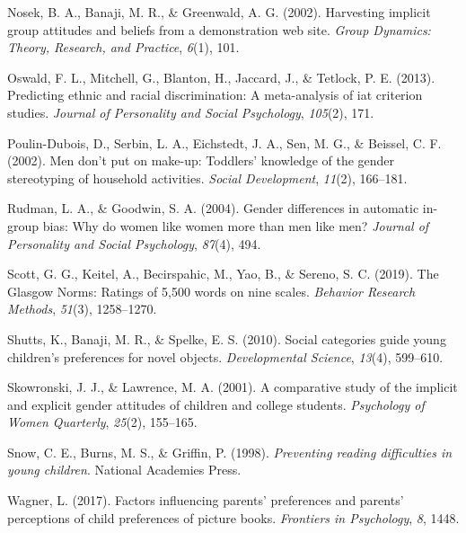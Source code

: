 \documentclass[
  english,
  ,man,floatsintext]{apa6}
\begin{document}
\leavevmode\hypertarget{ref-nosek2002harvesting}{}%
Nosek, B. A., Banaji, M. R., \& Greenwald, A. G. (2002). Harvesting implicit group attitudes and beliefs from a demonstration web site. \emph{Group Dynamics: Theory, Research, and Practice}, \emph{6}(1), 101.

\leavevmode\hypertarget{ref-oswald2013predicting}{}%
Oswald, F. L., Mitchell, G., Blanton, H., Jaccard, J., \& Tetlock, P. E. (2013). Predicting ethnic and racial discrimination: A meta-analysis of iat criterion studies. \emph{Journal of Personality and Social Psychology}, \emph{105}(2), 171.

\leavevmode\hypertarget{ref-poulin2002men}{}%
Poulin-Dubois, D., Serbin, L. A., Eichstedt, J. A., Sen, M. G., \& Beissel, C. F. (2002). Men don't put on make-up: Toddlers' knowledge of the gender stereotyping of household activities. \emph{Social Development}, \emph{11}(2), 166--181.

\leavevmode\hypertarget{ref-rudman2004gender}{}%
Rudman, L. A., \& Goodwin, S. A. (2004). Gender differences in automatic in-group bias: Why do women like women more than men like men? \emph{Journal of Personality and Social Psychology}, \emph{87}(4), 494.

\leavevmode\hypertarget{ref-scott2019glasgow}{}%
Scott, G. G., Keitel, A., Becirspahic, M., Yao, B., \& Sereno, S. C. (2019). The Glasgow Norms: Ratings of 5,500 words on nine scales. \emph{Behavior Research Methods}, \emph{51}(3), 1258--1270.

\leavevmode\hypertarget{ref-shutts2010social}{}%
Shutts, K., Banaji, M. R., \& Spelke, E. S. (2010). Social categories guide young children's preferences for novel objects. \emph{Developmental Science}, \emph{13}(4), 599--610.

\leavevmode\hypertarget{ref-skowronski2001comparative}{}%
Skowronski, J. J., \& Lawrence, M. A. (2001). A comparative study of the implicit and explicit gender attitudes of children and college students. \emph{Psychology of Women Quarterly}, \emph{25}(2), 155--165.

\leavevmode\hypertarget{ref-snow1998preventing}{}%
Snow, C. E., Burns, M. S., \& Griffin, P. (1998). \emph{Preventing reading difficulties in young children}. National Academies Press.

\leavevmode\hypertarget{ref-wagner2017factors}{}%
Wagner, L. (2017). Factors influencing parents' preferences and parents' perceptions of child preferences of picture books. \emph{Frontiers in Psychology}, \emph{8}, 1448.
\end{document}
